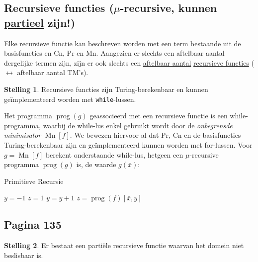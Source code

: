 \documentclass[kulak]{kulakarticle}
\DeclareMathOperator{\prog}{prog}
\DeclareMathOperator{\mn}{Mn}
\theoremstyle{definition}
\newtheorem*{stelling}{Stelling}
\begin{document}
	\newpage
	\subsection*{Recursieve functies (\(\mu\)-recursive, kunnen \underline{partieel} zijn!)}

	Elke recursieve functie kan beschreven worden met een term bestaande uit de basisfuncties en Cn, Pr en Mn. Aangezien er slechts een aftelbaar aantal dergelijke termen zijn, zijn er ook slechts een \underline{aftelbaar aantal} \underline{recursieve functies} (\(\leftrightarrow\) aftelbaar aantal TM's).

	\begin{stelling}
		Recursieve functies zijn Turing-berekenbaar en kunnen geïmplementeerd worden met \texttt{while}-lussen.
	\end{stelling}

	Het programma \(\prog(g)\) geassocieerd met een recursieve functie is een while-programma, waarbij de while-lus enkel gebruikt wordt door de \textit{onbegrensde minimisator} \(\mn[f]\). We bewezen hiervoor al dat Pr, Cn en de basisfuncties Turing-berekenbaar zijn en geïmplementeerd kunnen worden met for-lussen. Voor \(g=\mn[f]\) berekent onderstaande while-lus, hetgeen een \( \mu \)-recursive programma \(\prog(g)\) is, de waarde \(g(\bar{x})\):

	\begin{algorithm}
		\caption{Primitieve Recursie}
		\begin{algorithmic}[1]
			\State $y = -1$
			\State $z = 1$
				\State $y = y+1$
				\State $z=\prog(f)[\bar{x}, y]$
			\EndWhile
		\end{algorithmic}
	\end{algorithm}

	\subsection*{Pagina 135}

	\begin{stelling}
		Er bestaat een partiële recursieve functie waarvan het domein niet beslisbaar is.
	\end{stelling}
\end{document}
